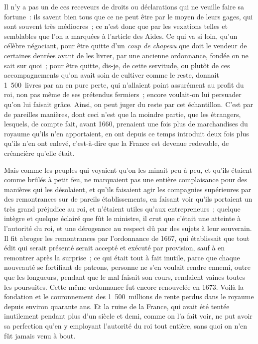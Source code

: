 \documentclass[french,twoside]{book} %
\begin{document}
Il n’y a pas un de ces receveurs de droits ou déclarations qui ne veuille faire sa fortune : ils savent bien tous que ce ne peut être par le moyen de leurs gages, qui sont souvent très médiocres ; ce n’est donc que par les vexations telles et semblables que l’on a marquées à l’article des Aides. Ce qui va si loin, qu’un célèbre négociant, pour être quitte d’un {\itshape coup de chapeau} que doit le vendeur de certaines denrées avant de les livrer, par une ancienne ordonnance, fondée on ne sait sur quoi ; pour être quitte, dis-je, de cette servitude, ou plutôt de ces accompagnements qu’on avait soin de cultiver comme le reste, donnait 1 500 livres par an en pure perte, qui n’allaient point assurément au profit du roi, non pas même de ses prétendus fermiers ; encore voulait-on lui persuader qu’on lui faisait grâce. Ainsi, on peut juger du reste par cet échantillon. C’est par de pareilles manières, dont ceci n’est que la moindre partie, que les étrangers, lesquels, de compte fait, avant 1660, prenaient une fois plus de marchandises du royaume qu’ils n’en apportaient, en ont depuis ce temps introduit deux fois plus qu’ils n’en ont enlevé, c’est-à-dire que la France est devenue redevable, de créancière qu’elle était.\par
Mais comme les peuples qui voyaient qu’on les minait peu à peu, et qu’ils étaient comme brûlés à petit feu, ne marquaient pas une entière complaisance pour des manières qui les désolaient, et qu’ils faisaient agir les compagnies supérieures par des remontrances sur de pareils établissements, en faisant voir qu’ils portaient un très grand préjudice au roi, et n’étaient utiles qu’aux entrepreneurs ; quelque intègre et quelque éclairé que fût le ministre, il crut que c’était une atteinte à l’autorité du roi, et une dérogeance au respect dû par des sujets à leur souverain. Il fit abroger les remontrances par l’ordonnance de 1667, qui établissait que tout édit qui serait présenté serait accepté et exécuté par provision, sauf à en remontrer après la surprise ; ce qui était tout à fait inutile, parce que chaque nouveauté se fortifiant de patrons, personne ne s’en voulait rendre ennemi, outre que les longueurs, pendant que le mal faisait son cours, rendaient vaines toutes les poursuites. Cette même ordonnance fut encore renouvelée en 1673. Voilà la fondation et le couronnement des 1 500 millions de rente perdus dans le royaume depuis environ quarante ans. Et la ruine de la France, qui avait été tentée inutilement pendant plus d’un siècle et demi, comme on l’a fait voir, ne put avoir sa perfection qu’en y employant l’autorité du roi tout entière, sans quoi on n’en fût jamais venu à bout.\par
\end{document}
